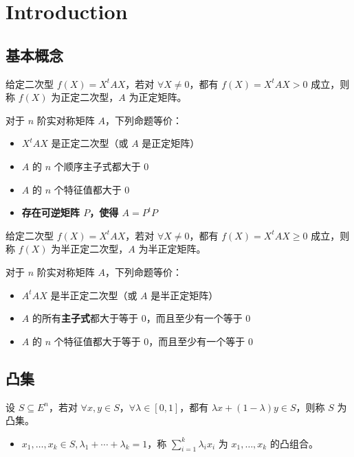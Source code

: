 \section{Introduction}

\subsection{基本概念}
\begin{definition}[二次型的正定性]
    给定二次型 $f(X) = X^t AX$，若对 $\forall X \neq 0$，都有 $f(X) = X^t AX > 0$ 成立，则称 $f(X)$ 为正定二次型，$A$ 为正定矩阵。
\end{definition}

\begin{theorem}
    对于 $n$ 阶实对称矩阵 $A$，下列命题等价：
    \begin{itemize}
        \item $X^t AX$ 是正定二次型（或 $A$ 是正定矩阵）
        \item $A$ 的 $n$ 个顺序主子式都大于 0
        \item $A$ 的 $n$ 个特征值都大于 0
        \item \textbf{存在可逆矩阵 $P$，使得 $A = P^t P$}
    \end{itemize}
\end{theorem}

\begin{definition}[二次型的半正定性]
    给定二次型 $f(X) = X^t AX$，若对 $\forall X \neq 0$，都有 $f(X) = X^t AX \ge 0$ 成立，则称 $f(X)$ 为半正定二次型，$A$ 为半正定矩阵。
\end{definition}

\begin{theorem}
    对于 $n$ 阶实对称矩阵 $A$，下列命题等价：
    \begin{itemize}
        \item $A^t AX$ 是半正定二次型（或 $A$ 是半正定矩阵）
        \item $A$ 的所有\textbf{主子式}都大于等于 0，而且至少有一个等于 0
        \item $A$ 的 $n$ 个特征值都大于等于 0，而且至少有一个等于 0
    \end{itemize}
\end{theorem}

\subsection{凸集}
\begin{definition}[凸集]
    设 $S \subseteq E^n$，若对 $\forall x, y \in S$，$\forall \lambda \in [0, 1]$，都有 $\lambda x + (1 - \lambda)y \in S$，则称 $S$ 为凸集。
    \begin{itemize}
        \item $x_1, \dots, x_k \in S, \lambda_1 + \cdots + \lambda_k = 1$，称 $\sum_{i = 1}^k \lambda_ix_i$ 为 $x_1, \dots, x_k$ 的凸组合。
    \end{itemize}
\end{definition}

